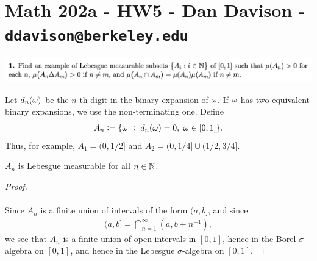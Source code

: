 \section*{Math 202a - HW5 - Dan Davison - \texttt{ddavison@berkeley.edu}}



\begin{mdframed}
\includegraphics[width=400pt]{img/analysis--berkeley-202a-hw05-781b.png}
\end{mdframed}


\begin{definition*}
  Let $d_n(\omega)$ be the $n$-th digit in the binary expansion of $\omega$. If $\omega$ has two equivalent binary
  expansions, we use the non-terminating one. Define
  \begin{align*}
    A_n := \{\omega ~:~ d_n(\omega) = 0, ~ \omega \in [0, 1]\}.
  \end{align*}
  Thus, for example, $A_1 = (0, 1/2]$ and $A_2 = (0, 1/4] \cup (1/2, 3/4]$.
\end{definition*}

\begin{claim*}
  $A_n$ is Lebesgue measurable for all $n \in \mathbb{N}$.
\end{claim*}

\begin{proof}~\\~\\
  Since $A_n$ is a finite union of intervals of the form $(a, b]$, and since
  \begin{align*}
    (a, b] = \bigcap_{n=1}^\infty (a, b + n^{-1}),
  \end{align*}
  we see that $A_n$ is a finite union of open intervals in $[0, 1]$, hence in the Borel $\sigma$-algebra
  on $[0, 1]$, and hence in the Lebesgue $\sigma$-algebra on $[0, 1]$.
\end{proof}

